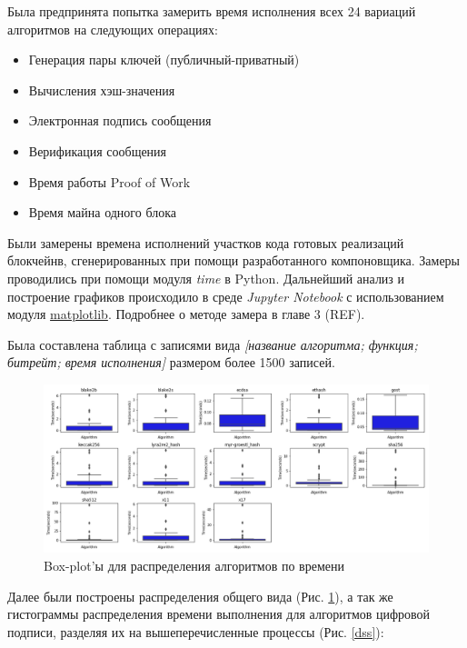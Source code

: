 Была предпринята попытка замерить время исполнения всех 24 вариаций алгоритмов на следующих операциях:

\begin{itemize}
\item Генерация пары ключей (публичный-приватный)
\item Вычисления хэш-значения
\item Электронная подпись сообщения
\item Верификация сообщения
\item Время работы Proof of Work
\item Время майна одного блока
\end{itemize}

Были замерены времена исполнений участков кода готовых реализаций блокчейнв,
сгенерированных при помощи разработанного компоновщика.
Замеры проводились при помощи модуля \emph{time} в Python. Дальнейший анализ и
построение графиков происходило в среде \emph{Jupyter Notebook} с
использованием модуля \underline{matplotlib}. Подробнее о методе замера в главе 3 (REF).

Была составлена таблица с записями вида \emph{[название алгоритма; функция; битрейт;
время исполнения]} размером более 1500 записей.

\begin{figure}
    \centering
    \includegraphics[width=\textwidth]{./images/boxes}
    \caption{Box-plot'ы для распределения алгоритмов по времени}\label{boxes}
\end{figure}

Далее были построены распределения общего вида (Рис. \ref{boxes}), а так же
гистограммы распределения времени выполнения для алгоритмов цифровой подписи,
разделяя их на вышеперечисленные процессы (Рис. \ref{dss}):

